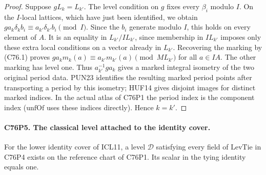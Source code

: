 \begin{proof}
Suppose $gL_k=L_{k'}$. The level condition on $g$ fixes every
$\beta_i$ modulo $I$. On the $I$-local lattices, which have just
been identified, we obtain $g a_k\delta_k b_i\equiv
a_{k'}\delta_{k'} b_i\pmod{I}$. Since the $b_i$ generate modulo
$I$, this holds on every element of $A$. It is an equality in
$L_{k'}/I L_{k'}$, since membership in $I L_{k'}$ imposes only
these extra local conditions on a vector already in $L_{k'}$.
Recovering the marking by (C76.1) proves
$g a_k m_k(a)\equiv a_{k'}m_{k'}(a)\pmod{M L_{k'}}$ for all
$a\in IA$. The other marking has level one. Thus
$a_{k'}^{-1}ga_k$ gives a marked integral isometry of the two
original period data. PUN23 identifies the resulting marked period
points after transporting a period by this isometry; HUF14 gives
disjoint images for distinct marked indices. In the actual atlas
of C76P1 the period index is the component index
($\mathrm{unfOf}$ uses these indices directly). Hence $k=k'$.
\end{proof}

\paragraph{C76P5. The classical level attached to the identity cover.}
For the lower identity cover of ICL11, a level $\mathcal D$ satisfying
every field of $\mathrm{LevTie}$ in C76P4 exists on the reference
chart of C76P1. Its scalar in the tying identity equals one.

